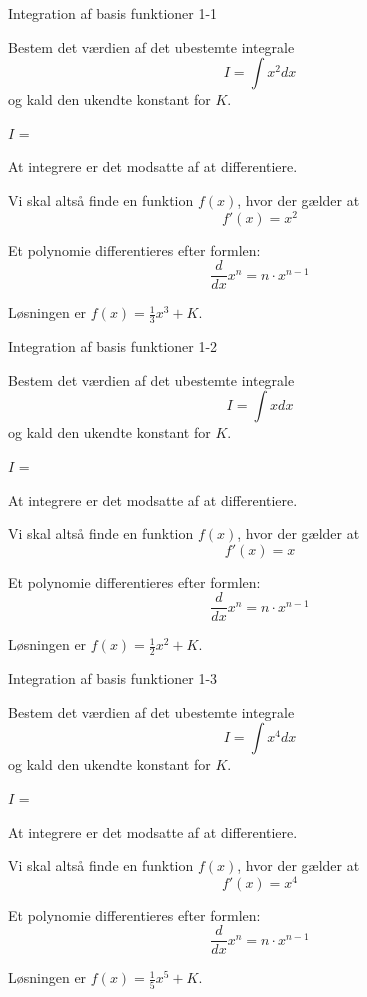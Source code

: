 \documentclass{article}
\begin{document}

\tableofcontents

\begin{exercise}{Integration af basis funktioner 1-1}

Bestem det værdien af det ubestemte integrale
\[
I = \int x^2 dx
\]
og kald den ukendte konstant for $K$.

$I$ = 

\hint
At integrere er det modsatte af at differentiere.

\hint
Vi skal altså finde en funktion $f(x)$, hvor der gælder at
\[
f'(x) = x^2
\]

\hint
Et polynomie differentieres efter formlen:
\[
\frac{d}{dx} x^n = n \cdot x^{n - 1}
\]

\hint
Løsningen er $f(x) = \frac{1}{3} x^3 + K$.

\end{exercise}


\begin{exercise}{Integration af basis funktioner 1-2}

Bestem det værdien af det ubestemte integrale
\[
I = \int x dx
\]
og kald den ukendte konstant for $K$.

$I$ = 

\hint
At integrere er det modsatte af at differentiere.

\hint
Vi skal altså finde en funktion $f(x)$, hvor der gælder at
\[
f'(x) = x
\]

\hint
Et polynomie differentieres efter formlen:
\[
\frac{d}{dx} x^n = n \cdot x^{n - 1}
\]

\hint
Løsningen er $f(x) = \frac{1}{2} x^2 + K$.

\end{exercise}


\begin{exercise}{Integration af basis funktioner 1-3}

Bestem det værdien af det ubestemte integrale
\[
I = \int x^4 dx
\]
og kald den ukendte konstant for $K$.

$I$ = 

\hint
At integrere er det modsatte af at differentiere.

\hint
Vi skal altså finde en funktion $f(x)$, hvor der gælder at
\[
f'(x) = x^4
\]

\hint
Et polynomie differentieres efter formlen:
\[
\frac{d}{dx} x^n = n \cdot x^{n - 1}
\]

\hint
Løsningen er $f(x) = \frac{1}{5} x^5 + K$.

\end{exercise}
\end{document}
